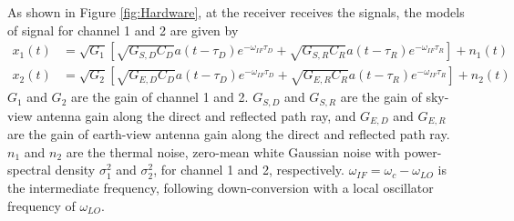 \documentclass[draftcls,onecolumn]{IEEEtran}  %
\begin{document}
As shown in Figure \ref{fig:Hardware}, at the  receiver receives the signals, the models of signal for channel 1 and 2 are given by
\begin{align}
 	x_1(t)&= \sqrt{G_1} \left[ 
       \sqrt{G_{S,D} C_D} a(t-\tau_{D}) e^{-\omega_{IF} \tau_D} + 
       \sqrt{G_{S,R} C_R} a(t-\tau_{R}) e^{-\omega_{IF} \tau_R} 
      \right] + n_1(t)  \label{Eq: x1_model} \\ 
    x_2(t)&=\sqrt{G_2}\left[ 
         \sqrt{G_{E,D} C_D}  a(t-\tau_{D}) e^{-\omega_{IF} \tau_D} + 
         \sqrt{G_{E,R} C_R} a(t-\tau_{R}) e^{-\omega_{IF} \tau_R}\right] + n_2(t) 
  \label{Eq: x2_model}
\end{align}
$G_1$ and $G_2$ are the gain of channel 1 and 2. $G_{S,D}$ and $G_{S,R}$ are the gain of sky-view antenna gain along the direct and reflected path ray, and  $G_{E,D}$ and $G_{E,R}$ are the gain of earth-view antenna gain along the direct and reflected path ray. $n_1$ and $n_2$ are the thermal noise,  zero-mean white Gaussian noise with power-spectral density $\sigma^2_1$ and $\sigma^2_2$, for channel 1 and 2, respectively.  $\omega_{IF} = \omega_c - \omega_{LO}$ is the intermediate frequency, following down-conversion with a local oscillator frequency of $\omega_{LO}$. 
\end{document}
